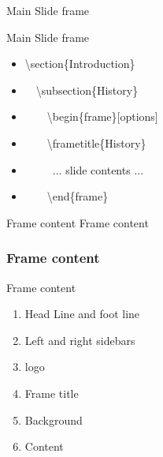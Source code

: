 \documentclass[ aspectratio=169,  10pt,blue,xcolor=pdftex,dvipsnames,table,handout,notes]{beamer}
\begin{document}

		\begin{frame}{Main Slide frame}

			\begin{block}{Main Slide frame}
			\begin{itemize}
			\item[] \textbackslash section\{Introduction\} 
			\item[] ~~\textbackslash subsection\{History\} 
			\item[] ~~~~\textbackslash begin\{frame\}[options] 
			\item[] ~~~~\textbackslash frametitle\{History\} 
			\item[] ~~~~~... slide contents ... 
			\item[] ~~~~\textbackslash end\{frame\} 
			\end{itemize}
			\end{block}



		\end{frame}


		\begin{frame}[plain]{Frame content}
			Frame content
		\end{frame}

		\begin{frame}
		\frametitle{Frame content}

			\begin{block} {Frame content}
			\begin{enumerate}
			\item Head Line and foot line
			\item Left and right sidebars
			\item logo
			\item Frame title
			\item Background
			\item Content
			\end{enumerate}
			\end{block}

		\end{frame}
\end{document}
